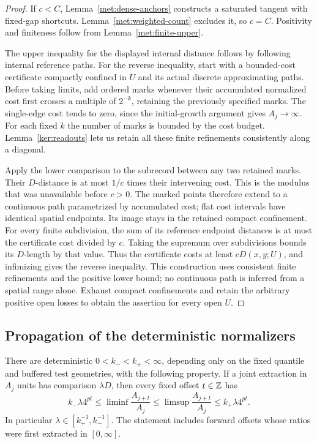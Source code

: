 \begin{proof}
If $c<C$, Lemma~\ref{met:dense-anchors} constructs a saturated
tangent with fixed-gap shortcuts.  Lemma~\ref{met:weighted-count}
excludes it, so $c=C$.  Positivity and finiteness follow from
Lemma~\ref{met:finite-upper}.

The upper inequality for the displayed internal distance follows
by following internal reference paths.  For the reverse inequality,
start with a bounded-cost certificate compactly confined in $U$ and
its actual discrete approximating paths.  Before taking limits, add
ordered marks whenever their accumulated normalized cost first crosses
a multiple of $2^{-k}$, retaining the previously specified marks.
The single-edge cost tends to zero, since the initial-growth argument
gives $A_j\to\infty$.  For each fixed $k$ the number of marks is
bounded by the cost budget.  Lemma~\ref{ker:readouts} lets us retain
all these finite refinements consistently along a diagonal.

Apply the lower comparison to the subrecord between any two retained
marks.  Their $D$-distance is at most $1/c$ times their intervening
cost.  This is the modulus that was unavailable before $c>0$.
The marked points therefore extend to a continuous path parametrized
by accumulated cost; flat cost intervals have identical spatial
endpoints.  Its image stays in the retained compact confinement.
For every finite subdivision, the sum of its reference endpoint
distances is at most the certificate cost divided by $c$.  Taking
the supremum over subdivisions bounds its $D$-length by that value.
Thus the certificate costs at least $cD(x,y;U)$, and infimizing gives
the reverse inequality.  This construction uses consistent finite
refinements and the positive lower bound; no continuous path is
inferred from a spatial range alone.  Exhaust compact confinements and retain
the arbitrary positive open losses to obtain the assertion for
every open $U$.
\end{proof}

\subsection{Propagation of the deterministic normalizers}

\begin{lemma}
\label{met:rigid-quantiles}
There are deterministic $0<k_-<k_+<\infty$, depending only on the
fixed quantile and buffered test geometries, with the following
property.  If a joint extraction in $A_j$ units has comparison
$\lambda D$, then every fixed offset $t\in\mathbb Z$ has
\begin{equation}
 k_-\lambda4^{pt}
 \leq \liminf\frac{A_{j+t}}{A_j}
 \leq \limsup\frac{A_{j+t}}{A_j}
 \leq k_+\lambda4^{pt}.
 \label{met:rigid-ratios}
\end{equation}
In particular $\lambda\in[k_+^{-1},k_-^{-1}]$.  The statement
includes forward offsets whose ratios were first extracted in
$[0,\infty]$.
\end{lemma}


